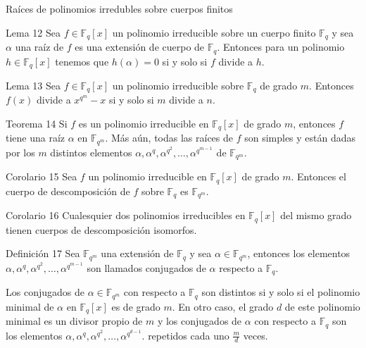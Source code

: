 \documentclass[presentation]{beamer}
\newcommand{\F}{\mathds{F}}
\begin{document}
\begin{frame}{Raíces de polinomios irredubles sobre cuerpos finitos}
  \begin{block}{Lema 12}
    Sea $f \in \F_q[x]$ un polinomio irreducible sobre un cuerpo finito $\F_q$ y sea $\alpha$ una raíz de $f$ es una extensión de cuerpo de $\F_q$. Entonces para un polinomio $h \in \F_q[x]$ tenemos que $h(\alpha) = 0$ si y solo si $f$ divide a $h$.
  \end{block}
  \pause
  \begin{block}{Lema 13}
    Sea $f \in \F_q[x]$ un polinomio irreducible sobre $\F_q$ de grado $m$. Entonces $f(x)$ divide a $x^{q^m}-x$ si y solo si $m$ divide a $n$.
  \end{block}
\end{frame}

\begin{frame}
  \begin{block}{Teorema 14}
    Si $f$ es un polinomio irreducible en $\F_q[x]$ de grado $m$, entonces $f$ tiene una raíz $\alpha$ en $\F_{q^m}$. Más aún, todas las raíces de $f$ son simples y están dadas por los $m$ distintos elementos $\alpha, \alpha^q, \alpha^{q^2}, \ldots, \alpha^{q^{m-1}}$ de $\F_{q^m}$.
  \end{block}
  \pause
  \begin{block}{Corolario 15}
    Sea $f$ un polinomio irreducible en $\F_q[x]$ de grado $m$. Entonces el cuerpo de descomposición de $f$ sobre $\F_q$ es $\F_{q^m}$.
  \end{block}
  \pause 
  \begin{block}{Corolario 16}
    Cualesquier dos polinomios irreducibles en $\F_q[x]$ del mismo grado tienen cuerpos de descomposición isomorfos.
  \end{block}
\end{frame}

\begin{frame}
  \begin{block}{Definición 17}
    Sea $\F_{q^m}$ una extensión de $\F_q$ y sea $\alpha \in \F_{q^m}$, entonces los elementos $\alpha, \alpha^q, \alpha^{q^2}, \ldots, \alpha^{q^{m-1}}$ son llamados conjugados de $\alpha$ respecto a $\F_q$.
  \end{block}
  \pause
  Los conjugados de $\alpha \in \F_{q^m}$ con respecto a $\F_q$ son distintos si y solo si el polinomio minimal de $\alpha$ en $\F_q[x]$ es de grado $m$. En otro caso, el grado $d$ de este polinomio minimal es un divisor propio de $m$ y los conjugados de $\alpha$ con respecto a $\F_q$ son los elementos $\alpha, \alpha^q, \alpha^{q^2}, \ldots, \alpha^{q^{d-1}}$. repetidos cada uno $\frac{m}{d}$ veces.
\end{frame}
\end{document}

